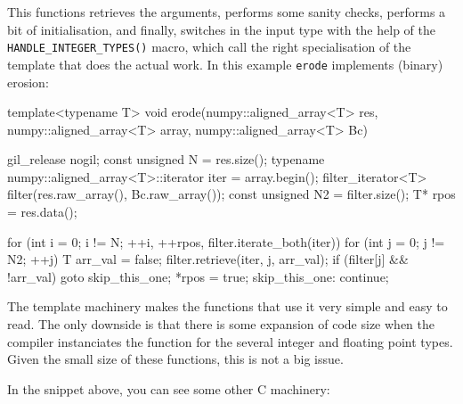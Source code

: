 \documentclass{article}
\newcommand*{\cpp}{{C\nolinebreak[4]\hspace{-.05em}\raisebox{.4ex}{\tiny\textbf{++}}}}
\let\code\texttt
\begin{document}
This functions retrieves the arguments, performs some sanity checks, performs a
bit of initialisation, and finally, switches in the input type with the help of
the \code{HANDLE\_INTEGER\_TYPES()} macro, which call the right specialisation
of the template that does the actual work. In this example \code{erode}
implements (binary) erosion:

\begin{cplusplus}
template<typename T>
void erode(numpy::aligned_array<T> res,
            numpy::aligned_array<T> array,
            numpy::aligned_array<T> Bc) {
    gil_release nogil;
    const unsigned N = res.size();
    typename numpy::aligned_array<T>::iterator iter = array.begin();
    filter_iterator<T> filter(res.raw_array(), Bc.raw_array());
    const unsigned N2 = filter.size();
    T* rpos = res.data();

    for (int i = 0;
                i != N;
                ++i, ++rpos, filter.iterate_both(iter)) {
        for (int j = 0; j != N2; ++j) {
            T arr_val = false;
            filter.retrieve(iter, j, arr_val);
            if (filter[j] && !arr_val) {
                goto skip_this_one;
            }
        }
        *rpos = true;
        skip_this_one: continue;
    }
}
\end{cplusplus}

The template machinery makes the functions that use it very simple and easy to
read. The only downside is that there is some expansion of code size when the
compiler instanciates the function for the several integer and floating point
types. Given the small size of these functions, this is not a big issue.

In the snippet above, you can see some other \cpp{} machinery:
\end{document}
